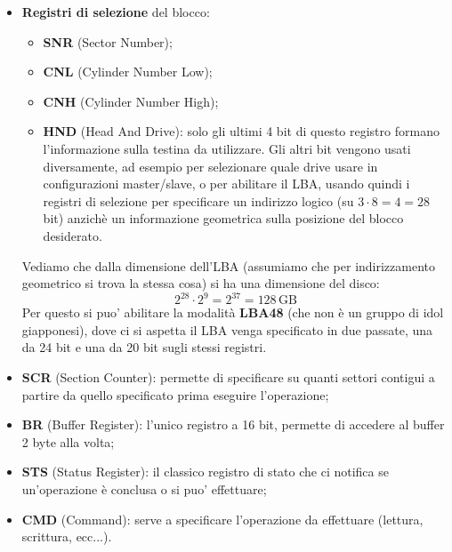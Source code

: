 \documentclass[a4paper,11pt]{article}
\begin{document}
\begin{itemize}
	\item \textbf{Registri di selezione} del blocco:
		\begin{itemize}
			\item \textbf{SNR} (Sector Number);
			\item \textbf{CNL} (Cylinder Number Low);
			\item \textbf{CNH} (Cylinder Number High);
			\item \textbf{HND} (Head And Drive): solo gli ultimi 4 bit di questo registro formano l'informazione sulla testina da utilizzare.
				Gli altri bit vengono usati diversamente, ad esempio per selezionare quale drive usare in configurazioni master/slave, o per abilitare il LBA, usando quindi i registri di selezione per specificare un indirizzo logico (su $3 \cdot 8 = 4 = 28$ bit) anzichè un informazione geometrica sulla posizione del blocco desiderato.
		\end{itemize}

		Vediamo che dalla dimensione dell'LBA (assumiamo che per indirizzamento geometrico si trova la stessa cosa) si ha una dimensione del disco:
		$$
		2^{28} \cdot 2^9 = 2^{37} = 128 \, \mathrm{GB}
		$$
		Per questo si puo' abilitare la modalità \textbf{LBA48} (che non è un gruppo di idol giapponesi), dove ci si aspetta il LBA venga specificato in due passate, una da 24 bit e una da 20 bit sugli stessi registri.
	\item \textbf{SCR} (Section Counter): permette di specificare su quanti settori contigui a partire da quello specificato prima eseguire l'operazione;
	\item \textbf{BR} (Buffer Register): l'unico registro a 16 bit, permette di accedere al buffer 2 byte alla volta;
	\item \textbf{STS} (Status Register): il classico registro di stato che ci notifica se un'operazione è conclusa o si puo' effettuare;
	\item \textbf{CMD} (Command): serve a specificare l'operazione da effettuare (lettura, scrittura, ecc...).
\end{itemize}
\end{document}
